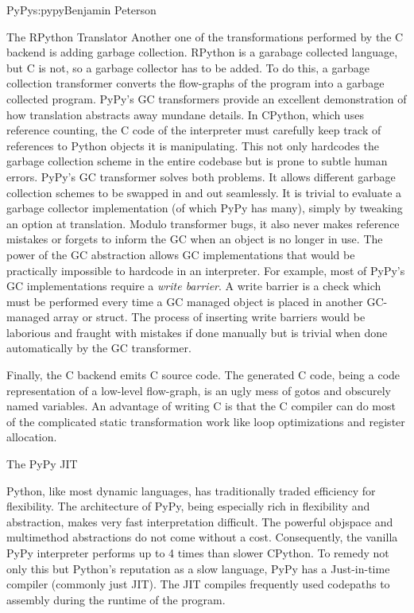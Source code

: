 \begin{aosachapter}{PyPy}{s:pypy}{Benjamin Peterson}
\begin{aosasect1}{The RPython Translator}
Another one of the transformations performed by the C backend is adding garbage
collection. RPython is a garabage collected language, but C is not, so a garbage
collector has to be added. To do this, a garbage collection transformer converts
the flow-graphs of the program into a garbage collected program. PyPy's GC
transformers provide an excellent demonstration of how translation abstracts
away mundane details. In CPython, which uses reference counting, the C code of
the interpreter must carefully keep track of references to Python objects it is
manipulating. This not only hardcodes the garbage collection scheme in the
entire codebase but is prone to subtle human errors. PyPy's GC transformer
solves both problems. It allows different garbage collection schemes to be
swapped in and out seamlessly. It is trivial to evaluate a garbage collector
implementation (of which PyPy has many), simply by tweaking an option at
translation. Modulo transformer bugs, it also never makes reference mistakes or
forgets to inform the GC when an object is no longer in use. The power of the GC
abstraction allows GC implementations that would be practically impossible to
hardcode in an interpreter. For example, most of PyPy's GC implementations
require a \emph{write barrier}. A write barrier is a check which must be
performed every time a GC managed object is placed in another GC-managed array
or struct. The process of inserting write barriers would be laborious and
fraught with mistakes if done manually but is trivial when done automatically by
the GC transformer.

Finally, the C backend emits C source code. The generated C code, being a code
representation of a low-level flow-graph, is an ugly mess of gotos and obscurely
named variables. An advantage of writing C is that the C compiler can do most of
the complicated static transformation work like loop optimizations and register
allocation.

\end{aosasect1}

\begin{aosasect1}{The PyPy JIT}
\label{sec:jit}

Python, like most dynamic languages, has traditionally traded efficiency for
flexibility. The architecture of PyPy, being especially rich in flexibility and
abstraction, makes very fast interpretation difficult. The powerful objspace and
multimethod abstractions do not come without a cost. Consequently, the vanilla
PyPy interpreter performs up to 4 times than slower CPython. To remedy not only
this but Python's reputation as a slow language, PyPy has a Just-in-time
compiler (commonly just JIT). The JIT compiles frequently used codepaths to
assembly during the runtime of the program.


\end{aosasect1}
\end{aosachapter}
